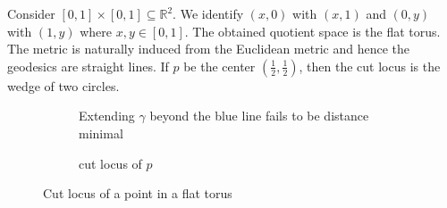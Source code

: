 \begin{eg}
    Consider $[0,1]\times [0,1]\subseteq \mathbb{R}^2$. We identify $(x,0)$ with $(x,1)$ and $(0,y)$ with $(1,y)$ where $x,y\in [0,1]$. The obtained quotient space is the flat torus. The metric is naturally induced from the Euclidean metric and hence the geodesics are straight lines. If $p$ be the center $\left(\frac{1}{2},\frac{1}{2}\right)$, then the cut locus is the wedge of two circles.
    \begin{figure}[!htpb]
        \centering
        \begin{subfigure}{.45\textwidth}
          \centering
          \caption{Extending $\gamma$ beyond the blue line fails to be distance minimal}
        \end{subfigure}%
        \begin{subfigure}{.45\textwidth}
            \centering
            \caption{cut locus of $p$}
          \end{subfigure}
        \caption{Cut locus of a point in a flat torus}
            \label{fig:Torus-CutLocusPoint}
    \end{figure}
\end{eg}



